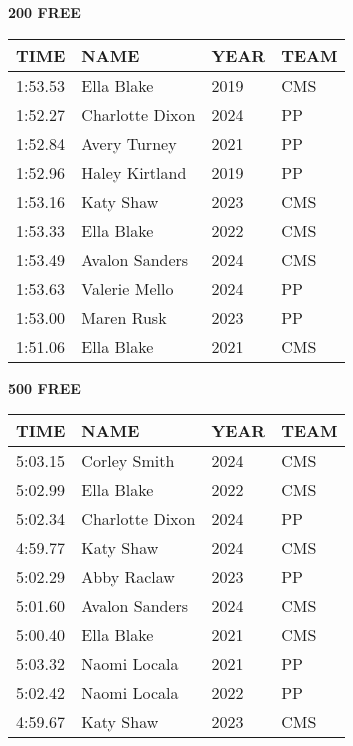 \vspace{0.4cm}

\begin{minipage}[t]{0.48\textwidth}
\centering
\textbf{200 FREE}\\[0.05cm]
\begin{tabular}{@{}p{1.8cm}p{2.8cm}p{1.2cm}p{1.4cm}@{}}
\hline
\textbf{TIME} & \textbf{NAME} & \textbf{YEAR} & \textbf{TEAM} \\
\hline
1:53.53 & Ella Blake & 2019 & CMS \\
1:52.27 & Charlotte Dixon & 2024 & PP \\
1:52.84 & Avery Turney & 2021 & PP \\
1:52.96 & Haley Kirtland & 2019 & PP \\
1:53.16 & Katy Shaw & 2023 & CMS \\
1:53.33 & Ella Blake & 2022 & CMS \\
1:53.49 & Avalon Sanders & 2024 & CMS \\
1:53.63 & Valerie Mello & 2024 & PP \\
1:53.00 & Maren Rusk & 2023 & PP \\
1:51.06 & Ella Blake & 2021 & CMS \\
\hline
\end{tabular}
\end{minipage}\hfill
\begin{minipage}[t]{0.48\textwidth}
\centering
\textbf{500 FREE}\\[0.05cm]
\begin{tabular}{@{}p{1.8cm}p{2.8cm}p{1.2cm}p{1.4cm}@{}}
\hline
\textbf{TIME} & \textbf{NAME} & \textbf{YEAR} & \textbf{TEAM} \\
\hline
5:03.15 & Corley Smith & 2024 & CMS \\
5:02.99 & Ella Blake & 2022 & CMS \\
5:02.34 & Charlotte Dixon & 2024 & PP \\
4:59.77 & Katy Shaw & 2024 & CMS \\
5:02.29 & Abby Raclaw & 2023 & PP \\
5:01.60 & Avalon Sanders & 2024 & CMS \\
5:00.40 & Ella Blake & 2021 & CMS \\
5:03.32 & Naomi Locala & 2021 & PP \\
5:02.42 & Naomi Locala & 2022 & PP \\
4:59.67 & Katy Shaw & 2023 & CMS \\
\hline
\end{tabular}
\end{minipage}

